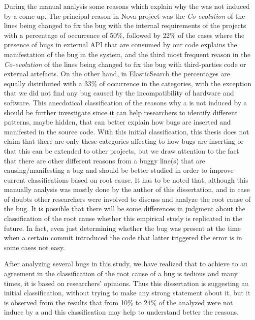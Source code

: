 \documentclass[a4paper, 12pt]{book}
\begin{document}
During the manual analysis some reasons which explain why the \BFC was not induced by a \BIC come up. The principal reason in Nova project was the \emph{Co-evolution} of the lines being changed to fix the bug with the internal requirements of the projects with a percentage of occurrence of 50\%, followed by 22\% of the cases where the presence of bugs in external API that are consumed by our code explains the manifestation of the bug in the system, and the third most frequent reason in the \emph{Co-evolution} of the lines being changed to fix the bug with third-parties code or external artefacts. On the other hand, in ElasticSearch the percentages are equally distributed with  a 33\% of occurrence in the categories, with the exception that we did not find any bug caused by the incompatibility of hardware and software. This anecdotical classification of the reasons why a \BFC is not induced by a \BIC should be further investigate since it can help researchers to identify different patterns, maybe hidden, that can better explain how bugs are inserted and manifested in the source code. With this initial classification, this thesis does not claim that there are only these categories affecting to how bugs are inserting or that this can be extended to other projects, but we draw attention to the fact that there are other different reasons from a buggy line(s) that are causing/manifesting a bug and should be better studied in order to improve current classifications based on root cause. It has to be noted that, although this manually analysis was mostly done by the author of this dissertation, and in case of doubts other researchers were involved to discuss and analyze the root cause of the bug. It is possible that there will be some differences in judgment about the classification of the root cause whether this empirical study is replicated in the future. In fact, even just determining whether the bug was present at the time when a certain commit introduced the code that latter triggered the error is in some cases not easy.  

After analyzing several bugs in this study, we have realized that to achieve to an agreement in the classification of the root cause of a bug is tedious and many times, it is based on researchers' opinions. Thus this dissertation is suggesting an initial classification, without trying to make any strong statement about it, but it is observed from the results that from 10\% to 24\%  of the analyzed \BFC were not induce by a \BIC and this classification may help to understand better the reasons. 
\end{document}
